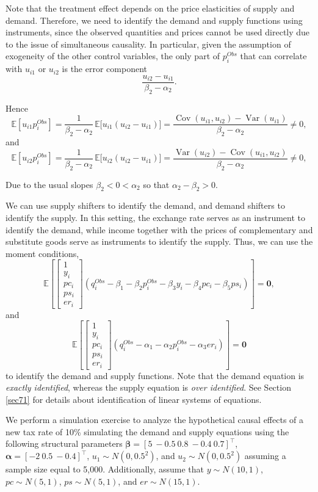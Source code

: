 Note that the treatment effect depends on the price elasticities of supply and demand. Therefore, we need to identify the demand and supply functions using instruments, since the observed quantities and prices cannot be used directly due to the issue of simultaneous causality. In particular, given the assumption of exogeneity of the other control variables, the only part of $p_i^{Obs}$ that can correlate with $u_{i1}$ or $u_{i2}$ is the error component
\[
\frac{u_{i2}-u_{i1}}{\beta_2-\alpha_2}.
\]

Hence
\[
\mathbb{E}[u_{i1}p_i^{Obs}]
=\frac{1}{\beta_2-\alpha_2}\,\mathbb{E}\!\big[u_{i1}(u_{i2}-u_{i1})\big]
=\frac{\operatorname{Cov}(u_{i1},u_{i2})-\operatorname{Var}(u_{i1})}{\beta_2-\alpha_2}\neq 0,
\]
and
\[
\mathbb{E}[u_{i2}p_i^{Obs}]
=\frac{1}{\beta_2-\alpha_2}\,\mathbb{E}\!\big[u_{i2}(u_{i2}-u_{i1})\big]
=\frac{\operatorname{Var}(u_{i2})-\operatorname{Cov}(u_{i1},u_{i2})}{\beta_2-\alpha_2}\neq 0,
\]

Due to the usual slopes $\beta_2<0<\alpha_2$ so that $\alpha_2-\beta_2>0$.

We can use supply shifters to identify the demand, and demand shifters to identify the supply. In this setting, the exchange rate serves as an instrument to identify the demand, while income together with the prices of complementary and substitute goods serve as instruments to identify the supply. Thus, we can use the moment conditions,
\[
\mathbb{E}\left[\begin{bmatrix}
	1\\
	y_i\\
	pc_i\\
	ps_i\\
	er_i
\end{bmatrix}(q_i^{Obs}-\beta_1-\beta_2p_i^{Obs}-\beta_3y_i-\beta_4pc_i-\beta_5ps_i)\right]=\mathbf{0},
\] 
and 
\[
\mathbb{E}\left[\begin{bmatrix}
	1\\
	y_i\\
	pc_i\\
	ps_i\\
	er_i
\end{bmatrix}(q_i^{Obs}-\alpha_1-\alpha_2p_i^{Obs}-\alpha_3er_i)\right]=\mathbf{0}
\]
to identify the demand and supply functions. Note that the demand equation is \textit{exactly identified}, whereas the supply equation is \textit{over identified}. See Section \ref{sec71} for details about identification of linear systems of equations.

We perform a simulation exercise to analyze the hypothetical causal effects of a new tax rate of 10\% simulating the demand and supply equations using the following structural parameters $\bm{\beta} = \left[ 5 \ -0.5 \ 0.8 \ -0.4 \ 0.7 \right]^{\top}$, $\bm{\alpha} = \left[ -2 \ 0.5 \ -0.4 \right]^{\top}$, $u_1 \sim N(0, 0.5^2)$, and $u_2 \sim N(0, 0.5^2)$ assuming a sample size equal to 5,000. Additionally, assume that $y \sim N(10, 1)$, $pc \sim N(5, 1)$, $ps \sim N(5, 1)$, and $er \sim N(15, 1)$. 

